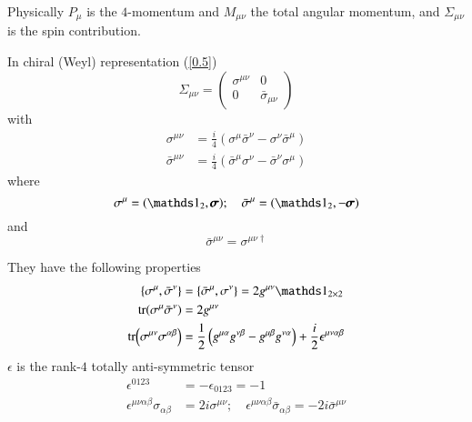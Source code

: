Physically $P_\mu$ is the $4$-momentum and $M_{\mu\nu}$ the total angular momentum, and $\Sigma_{\mu\nu}$ is the spin contribution.

In chiral (Weyl) representation (\ref{0.5})
\begin{equation}
   \Sigma_{\mu\nu} = \begin{pmatrix} \sigma^{\mu\nu} & 0 \\ 0 & \bar{\sigma}_{\mu\nu}\end{pmatrix} \label{3.36a}
\end{equation}
with
\begin{align}
   \sigma^{\mu\nu} &= \frac{i}{4} \left( \sigma^\mu \bar\sigma^\nu - \sigma^\nu \bar \sigma^\mu \right) \label{3.36b} \\
   \bar\sigma^{\mu\nu} &= \frac{i}{4} \left( \bar\sigma^\mu \sigma^\nu - \bar\sigma^\nu \sigma^\mu \right) \label{3.36c}
\end{align}
where
\begin{equation}
   \sigma^\mu = (\id_{2}, \pmb{\sigma}); \quad \bar\sigma^{\mu} = (\id_{2}, - \pmb{\sigma}) \label{3.37}
\end{equation}
and
\begin{equation}
   \bar\sigma^{\mu\nu} = \sigma^{\mu\nu\dagger}
\end{equation}

They have the following properties
\begin{subequations}
\begin{align}
   \acomm{\sigma^\mu}{\bar\sigma^\nu} &= \acomm{\bar\sigma^\mu}{\sigma^\nu} = 2g^{\mu\nu} \id_{2\times 2} \label{3.39} \\
   \tr(\sigma^\mu \bar\sigma^\nu) &= 2 g^{\mu\nu} \label{3.40} \\
   \tr(\sigma^{\mu\nu}\sigma^{\alpha\beta}) &= \frac{1}{2} \left( g^{\mu\alpha} g^{\nu\beta} - g^{\mu\beta} g^{\nu\alpha} \right) + \frac{i}{2} \epsilon^{\mu\nu\alpha\beta} \label{3.41}
\end{align}
\end{subequations}
$\epsilon$ is the rank-$4$ totally anti-symmetric tensor
\begin{subequations}
\begin{align}
   \epsilon^{0123} &= - \epsilon_{0123} = -1 \label{3.42} \\
   \epsilon^{\mu\nu\alpha\beta} \sigma_{\alpha\beta} &= 2i \sigma^{\mu\nu}; \quad \epsilon^{\mu\nu\alpha\beta} \bar\sigma_{\alpha\beta} = -2i \bar\sigma^{\mu\nu} \label{3.43}
\end{align}
\end{subequations}

